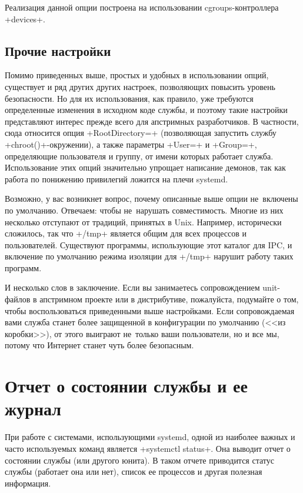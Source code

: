 \documentclass[10pt,oneside,a4paper]{article}
\begin{document}
Реализация данной опции построена на использовании cgroups-контроллера
+devices+.

\subsection{Прочие настройки}

Помимо приведенных выше, простых и удобных в использовании опций, существует и
ряд других других настроек, позволяющих повысить уровень безопасности. Но
для их использования, как правило, уже требуются определенные изменения в
исходном коде службы, и поэтому такие настройки представляют интерес прежде
всего для апстримных разработчиков. В частности, сюда относится опция
+RootDirectory=+ (позволяющая запустить службу +chroot()+-окружении), а также
параметры +User=+ и +Group=+, определяющие пользователя и группу, от имени
которых работает служба.  Использование этих опций значительно упрощает
написание демонов, так как работа по понижению привилегий ложится на плечи
systemd.

Возможно, у вас возникнет вопрос, почему описанные выше опции не~включены по
умолчанию.  Отвечаем: чтобы не~нарушать совместимость. Многие из них несколько
отступают от традиций, принятых в Unix. Например, исторически сложилось, так что
+/tmp+ является общим для всех процессов и пользователей. Существуют программы,
использующие этот каталог для IPC, и включение по умолчанию режима изоляции для
+/tmp+ нарушит работу таких программ.

И несколько слов в заключение. Если вы занимаетесь сопровождением unit-файлов
в апстримном проекте или в дистрибутиве, пожалуйста, подумайте о том, чтобы
воспользоваться приведенными выше настройками. Если сопровождаемая вами служба
станет более защищенной в конфигурации по умолчанию (<<из коробки>>), от этого
выиграют не~только ваши пользователи, но и все мы, потому что Интернет станет
чуть более безопасным.

\section{Отчет о состоянии службы и ее журнал}
\label{sec:journal}

При работе с системами, использующими systemd, одной из наиболее важных и часто
используемых команд является +systemctl status+. Она выводит отчет о состоянии
службы (или другого юнита). В таком отчете приводится статус службы (работает
она или нет), список ее процессов и другая полезная информация.
\end{document}
